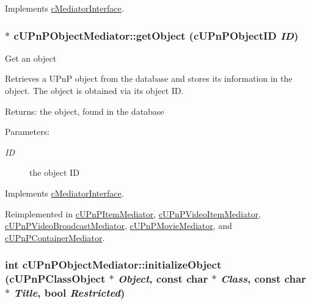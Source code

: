 Implements \hyperlink{classcMediatorInterface_ffbddb7fe72554b9cde9d02648cf8f0e}{cMediatorInterface}.\hypertarget{classcUPnPObjectMediator_5b4fff612476fb51690919f9c59899a5}{
\subsubsection[{getObject}]{ $\ast$ cUPnPObjectMediator::getObject ({\bf cUPnPObjectID} {\em ID})}}
\label{classcUPnPObjectMediator_5b4fff612476fb51690919f9c59899a5}


Get an object

Retrieves a UPnP object from the database and stores its information in the object. The object is obtained via its object ID.

\begin{Desc}
\item[Returns:]the object, found in the database \end{Desc}
\begin{Desc}
\item[Parameters:]
\begin{description}
\item[{\em ID}]the object ID \end{description}
\end{Desc}
 

Implements \hyperlink{classcMediatorInterface_716ad95bf6ac5a10e9409ced7a63a9d8}{cMediatorInterface}.

Reimplemented in \hyperlink{classcUPnPItemMediator_81411b2a472ade71d73a9c8ddc2a7990}{cUPnPItemMediator}, \hyperlink{classcUPnPVideoItemMediator_dd8927340a69d247965ef9250adefb21}{cUPnPVideoItemMediator}, \hyperlink{classcUPnPVideoBroadcastMediator_c13bf0f008f49b0ab499542391998a24}{cUPnPVideoBroadcastMediator}, \hyperlink{classcUPnPMovieMediator_d85b240eb54efd9ab46c440b51c71e83}{cUPnPMovieMediator}, and \hyperlink{classcUPnPContainerMediator_78b71f96fb4289dc78f897d6282078d6}{cUPnPContainerMediator}.\hypertarget{classcUPnPObjectMediator_a5a3c6d0fd0cff8c74e6fc40d723290f}{
\subsubsection[{initializeObject}]{\setlength{\rightskip}{0pt plus 5cm}int cUPnPObjectMediator::initializeObject ({\bf cUPnPClassObject} $\ast$ {\em Object}, \/  const char $\ast$ {\em Class}, \/  const char $\ast$ {\em Title}, \/  bool {\em Restricted})}}
\label{classcUPnPObjectMediator_a5a3c6d0fd0cff8c74e6fc40d723290f}


